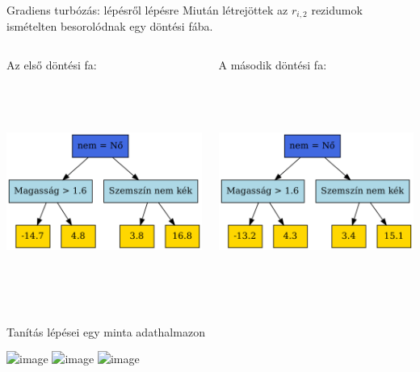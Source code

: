 \documentclass[english, aspectratio=169]{beamer}
\begin{document}
\begin{frame}{Gradiens turbózás: lépésről lépésre}
Miután létrejöttek az $r_{i,2}$ rezidumok ismételten besorolódnak egy döntési fába.\par\medskip
\begin{columns}
\begin{column}{.5\textwidth}
Az első döntési fa:
\begin{center}
\includegraphics[width=7cm, height=7cm, keepaspectratio]{graphs/ensemble_6.png}
\end{center}
\end{column}
\begin{column}{.5\textwidth}
A második döntési fa:
\begin{center}
\includegraphics[width=7cm, height=7cm, keepaspectratio]{graphs/ensemble_7.png}
\end{center}
\end{column}
\end{columns}
\end{frame}

\begin{frame}{Tanítás lépései egy minta adathalmazon}
\begin{center}
\includegraphics<1>[width=14cm, keepaspectratio]{images/ensemble_11.png}
\includegraphics<2>[width=14cm, keepaspectratio]{images/ensemble_12.png}
\includegraphics<3>[width=14cm, keepaspectratio]{images/ensemble_13.png}
\end{center}
\end{frame}
\end{document}
